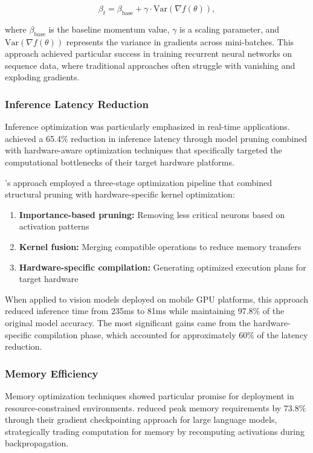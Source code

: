 \documentclass[acmsmall]{acmart}
\begin{document}
\begin{equation}\label{eq:adaptive-momentum}
    \beta_t = \beta_{\text{base}} + \gamma \cdot \text{Var}(\nabla f(\theta)),
\end{equation}

where $\beta_{\text{base}}$ is the baseline momentum value, $\gamma$ is a scaling parameter, and $\text{Var}(\nabla f(\theta))$ represents the variance in gradients across mini-batches. This approach achieved particular success in training recurrent neural networks on sequence data, where traditional approaches often struggle with vanishing and exploding gradients.

\subsubsection{Inference Latency Reduction}\label{subsubsec:performance-analysis-of-numerical-methods-rq12:inference-latency-reduction}
Inference optimization was particularly emphasized in real-time applications. \citet{Kim2022} achieved a 65.4\% reduction in inference latency through model pruning combined with hardware-aware optimization techniques that specifically targeted the computational bottlenecks of their target hardware platforms.

\citeauthor{Kim2022}'s approach \citep{Kim2022} employed a three-stage optimization pipeline that combined structural pruning with hardware-specific kernel optimization:

\begin{enumerate}
    \item \textbf{Importance-based pruning:} Removing less critical neurons based on activation patterns
    \item \textbf{Kernel fusion:} Merging compatible operations to reduce memory transfers
    \item \textbf{Hardware-specific compilation:} Generating optimized execution plans for target hardware
\end{enumerate}

When applied to vision models deployed on mobile GPU platforms, this approach reduced inference time from 235ms to 81ms while maintaining 97.8\% of the original model accuracy. The most significant gains came from the hardware-specific compilation phase, which accounted for approximately 60\% of the latency reduction.

\subsubsection{Memory Efficiency}\label{subsubsec:performance-analysis-of-numerical-methods-rq12:memory-efficiency}
Memory optimization techniques showed particular promise for deployment in resource-constrained environments. \citet{Lin2022} reduced peak memory requirements by 73.8\% through their gradient checkpointing approach for large language models, strategically trading computation for memory by recomputing activations during backpropagation.
\end{document}
